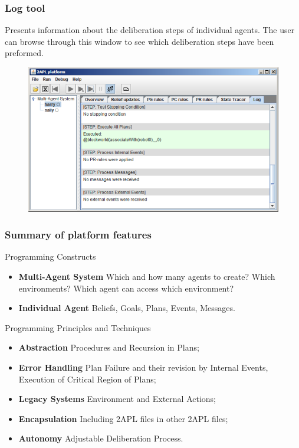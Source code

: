 \documentclass{beamer}
\begin{document}
\begin{frame}
\frametitle{Log tool}
Presents information about the deliberation steps of individual agents. The user can browse through this window to see which deliberation steps have been preformed.

	\begin{figure}
	\includegraphics[width=0.65\linewidth]{images/2APLLog.png}
	\end{figure}
\end{frame}

\begin{frame}
\frametitle{Summary of platform features}
Programming Constructs
	\begin{itemize}
	\item \textbf{Multi-Agent System} Which and how many agents to create? Which environments? Which agent can access which environment?
	\item \textbf{Individual Agent} Beliefs, Goals, Plans, Events, Messages.
	\end{itemize}
    
Programming Principles and Techniques
	\begin{itemize}
	\item \textbf{Abstraction} Procedures and Recursion in Plans;
	\item \textbf{Error Handling} Plan Failure and their revision by Internal Events, Execution of Critical Region of Plans;
	\item \textbf{Legacy Systems} Environment and External Actions;
    \item \textbf{Encapsulation} Including 2APL files in other 2APL files;
    \item \textbf{Autonomy} Adjustable Deliberation Process.
	\end{itemize}

\end{frame}

\end{document}
